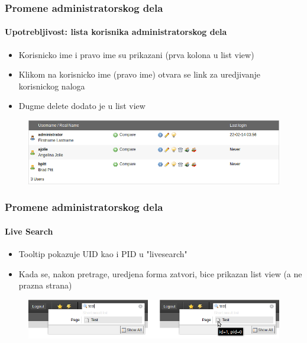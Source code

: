 
\begin{frame}[fragile]
	\frametitle{Promene administratorskog dela}
	\framesubtitle{Upotrebljivost: lista korisnika administratorskog dela}

	\begin{itemize}
		\item Korisnicko ime i pravo ime su prikazani (prva kolona u list view)
		\item Klikom na korisnicko ime (pravo ime) otvara se link za uredjivanje korisnickog naloga
		\item Dugme delete dodato je u list view

	\end{itemize}

	\begin{figure}
		\includegraphics[width=0.95\linewidth]{Images/BackendChanges/BackendUserList.png}
	\end{figure}

\end{frame}


\begin{frame}[fragile]
	\frametitle{Promene administratorskog dela}
	\framesubtitle{Live Search}

	\begin{itemize}
		\item Tooltip pokazuje UID kao i PID u "livesearch"
		\item Kada se, nakon pretrage, uredjena forma zatvori, bice prikazan list view (a ne prazna strana)
	\end{itemize}

	\begin{figure}
		\includegraphics[width=0.8\linewidth]{Images/BackendChanges/LiveSearchTooltip.png}
	\end{figure}

\end{frame}


